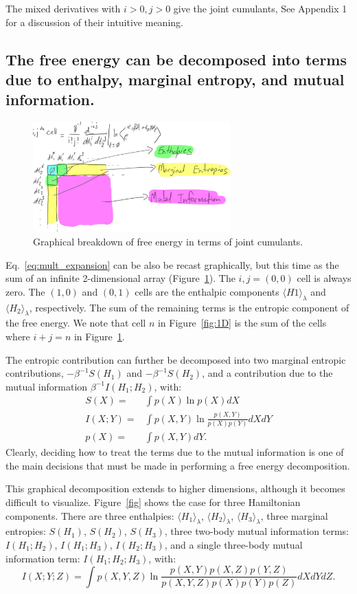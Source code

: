 \documentclass{article}
\begin{document}
The mixed derivatives with $i>0, j>0$ give the joint cumulants, See Appendix 1 for a discussion of their intuitive meaning.




\subsection{The free energy can be decomposed into terms due to enthalpy, marginal entropy, and mutual information.}

\begin{figure}[htb]
\centering
\includegraphics[width=3in]{figure2.pdf}
\caption{Graphical breakdown of free energy in terms of joint cumulants.}
\label{fig:2D}
\end{figure}

Eq.~\ref{eq:mult_expansion} can be also be recast graphically, but this time as the sum of an infinite 2-dimensional array (Figure~\ref{fig:2D}). The $i,j=(0,0)$ cell is always zero. The $(1,0)$ and $(0,1)$ cells are the enthalpic components $\langle H1 \rangle_\lambda$ and $\langle H_2 \rangle_\lambda$, respectively. The sum of the remaining terms is the entropic component of the free energy. We note that cell $n$ in Figure~\ref{fig:1D} is the sum of the cells where $i+j=n$ in Figure~\ref{fig:2D}. 

The entropic contribution can further be decomposed into two marginal entropic contributions, $-\beta^{-1}S(H_1)$ and $-\beta^{-1}S(H_2)$, and a contribution due to the mutual information $\beta^{-1}I(H_1; H_2)$, with:
\begin{align}
S(X) =& \int p(X) \ln p(X) dX \nonumber\\
I(X; Y) =& \int p(X,Y) \ln \frac{p(X,Y)}{p(X)p(Y)} dX dY \nonumber\\
p(X) =& \int p(X,Y) dY.
\end{align}
Clearly, deciding how to treat the terms due to the mutual information is one of the main decisions that must be made in performing a free energy decomposition.

This graphical decomposition extends to higher dimensions, although it becomes difficult to visualize. Figure~\ref{fig} shows the case for three Hamiltonian components. There are three enthalpies: $\langle H_1 \rangle_\lambda$, $\langle H_2 \rangle_\lambda$, $\langle H_3 \rangle_\lambda$, three marginal entropies: $S(H_1)$, $S(H_2)$, $S(H_3)$, three two-body mutual information terms: $I(H_1; H_2)$, $I(H_1; H_3)$, $I(H_2; H_3)$, and a single three-body mutual information term: $I(H_1; H_2; H_3)$, with:
\begin{equation}
I(X; Y; Z) = \int p(X,Y,Z) \ln \frac{p(X,Y)p(X,Z)p(Y,Z)}{p(X,Y,Z)p(X)p(Y)p(Z)} dX dY dZ.
\end{equation} 
\end{document}
